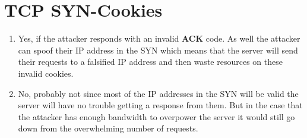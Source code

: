 \documentclass{article}
\begin{document}
\section{TCP SYN-Cookies }
\begin{enumerate}[A]
	\item Yes, if the attacker responds with an invalid {\bf ACK} code. As well
		the attacker can spoof their IP address in the SYN which means that the
		server will send their requests to a falsified IP address and then
		waste resources on these invalid cookies.
	\item No, probably not since most of the IP addresses in the SYN will be
		valid the server will have no trouble getting a response from them. But
		in the case that the attacker has enough bandwidth to overpower the
		server it would still go down from the overwhelming number of requests.
\end{enumerate}
\end{document}
